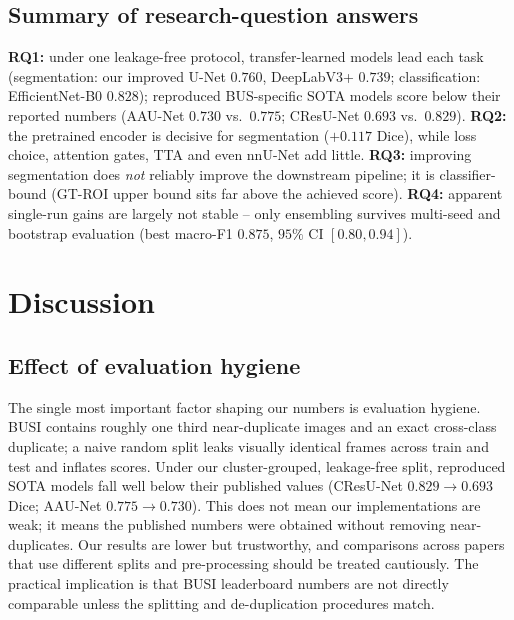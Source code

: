 \documentclass[11pt]{article}
\begin{document}
\subsection{Summary of research-question answers}
\label{sec:results-rq}
\textbf{RQ1:} under one leakage-free protocol, transfer-learned models lead each
task (segmentation: our improved U-Net $0.760$, DeepLabV3+ $0.739$;
classification: EfficientNet-B0 $0.828$); reproduced BUS-specific SOTA models score
below their reported numbers (AAU-Net $0.730$ vs.\ $0.775$; CResU-Net $0.693$ vs.\
$0.829$). \textbf{RQ2:} the pretrained encoder is decisive for segmentation
($+0.117$ Dice), while loss choice, attention gates, TTA and even nnU-Net add
little. \textbf{RQ3:} improving segmentation does \emph{not} reliably improve the
downstream pipeline; it is classifier-bound (GT-ROI upper bound sits far above the
achieved score). \textbf{RQ4:} apparent single-run gains are largely not stable --
only ensembling survives multi-seed and bootstrap evaluation (best macro-F1
$0.875$, $95\%$ CI $[0.80,0.94]$).

\section{Discussion}
\label{sec:discussion}
\subsection{Effect of evaluation hygiene}
The single most important factor shaping our numbers is evaluation hygiene. BUSI
contains roughly one third near-duplicate images and an exact cross-class
duplicate; a naive random split leaks visually identical frames across train and
test and inflates scores. Under our cluster-grouped, leakage-free split, reproduced
SOTA models fall well below their published values (CResU-Net $0.829\to0.693$ Dice;
AAU-Net $0.775\to0.730$). This does not mean our implementations are weak; it means
the published numbers were obtained without removing near-duplicates. Our results
are lower but trustworthy, and comparisons across papers that use different splits
and pre-processing should be treated cautiously. The practical implication is that
BUSI leaderboard numbers are not directly comparable unless the splitting and
de-duplication procedures match.
\end{document}

